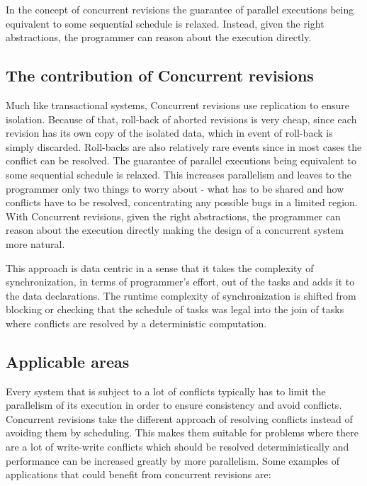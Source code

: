 \documentclass[12pt,twoside,notitlepage]{report}
\begin{document}
In the concept of concurrent revisions the guarantee of parallel executions being equivalent to some sequential schedule is relaxed. Instead, given the right abstractions, the programmer can reason about the execution directly.  

\subsection{The contribution of Concurrent revisions}

Much like transactional systems, Concurrent revisions use replication to ensure isolation. Because of that, roll-back of aborted revisions is very cheap, since each revision has its own copy of the isolated data, which in event of roll-back is simply discarded. Roll-backs are also relatively rare events since in most cases the conflict can be resolved. The guarantee of parallel executions being equivalent to some sequential schedule is relaxed. This increases parallelism and leaves to the programmer only two things to worry about - what has to be shared and how conflicts have to be resolved, concentrating any possible bugs in a limited region. With Concurrent revisions, given the right abstractions, the programmer can reason about the execution directly making the design of a concurrent system more natural.

This approach is data centric in a sense that it takes the complexity of synchronization, in terms of programmer's effort, out of the tasks and adds it to the data declarations. The runtime complexity of synchronization is shifted from blocking or checking that the schedule of tasks was legal into the join of tasks where conflicts are resolved by a deterministic computation.   

\subsection{Applicable areas}
Every system that is subject to a lot of conflicts typically has to limit the parallelism of its execution in order to ensure consistency and avoid conflicts. Concurrent revisions take the different approach of resolving conflicts instead of avoiding them by scheduling. This makes them suitable for problems where there are a lot of write-write conflicts which should be resolved deterministically and performance can be increased greatly by more parallelism. Some examples of applications that could benefit from concurrent revisions are: 
\end{document}
